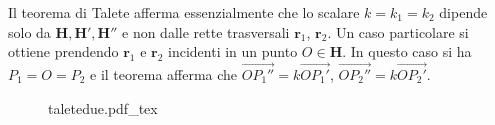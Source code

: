 \documentclass{article}
\theoremstyle{plain}
\theoremstyle{definition}
\theoremstyle{remark}
\newcommand{\incfig}[2][\columnwidth]{%
    \def\svgwidth{#1}
    {#2.pdf_tex}
}
\begin{document}
\vspace{10pt}

Il teorema di Talete afferma essenzialmente che lo scalare $k = k_1 = k_2$ dipende solo da $\mathbf{H}, \mathbf{H}', \mathbf{H}''$ e non dalle rette trasversali $\mathbf{r}_1$, $\mathbf{r}_2$. 
Un caso particolare si ottiene prendendo $\mathbf{r}_1$ e $\mathbf{r}_2$ incidenti in un punto $O \in \mathbf{H}$. 
In questo caso si ha $P_1 = O = P_2$ e il teorema afferma che $\overrightarrow{OP_1''} = k\overrightarrow{OP_1'}$, $\overrightarrow{OP_2''} = k\overrightarrow{OP_2'}$.
\begin{figure}[H]
    \centering
    \incfig[0.7\linewidth]{taletedue}
\end{figure}

\vspace{10pt}
\end{document}
